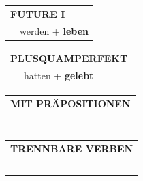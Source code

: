 \documentclass[10pt,a4paper]{revtex4-2}
\begin{document}
\begin{verbbox}
\begin{tabular}{rl}
    \multicolumn{2}{l}{\textbf{FUTURE I} }\\
   & werden + \textbf{leben}\\
 
  \end{tabular}
\hfill
   \begin{tabular}{rl}
      \multicolumn{2}{l}{\textbf{PLUSQUAMPERFEKT}}\\
  &  hatten + \textbf{gelebt}\\
  \end{tabular}
  
  \vspace{10pt}

\begin{tabular}{lll}
\multicolumn{3}{l}{\textbf{MIT PRÄPOSITIONEN}}\\
& ---\\
\end{tabular}
\hfill
\begin{tabular}{lll}
\multicolumn{3}{l}{\textbf{TRENNBARE VERBEN}}\\
& ---\\
\end{tabular}

  \vspace{-5pt}

\end{verbbox}
\end{document}
